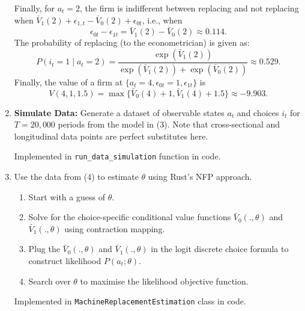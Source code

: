 \documentclass{article}
\begin{document}
\begin{enumerate}
\begin{answer}
Finally, for $a_t = 2$, the firm is indifferent between replacing and not replacing when $\bar{V}_1(2) + \epsilon_{1,t} - \bar{V}_0(2) + \epsilon_{0t}$, i.e., when 
\[
\epsilon_{0t} - \epsilon_{1t} = \bar{V}_1(2) - \bar{V}_0(2)  \approx 0.114.
\]
The probability of replacing (to the econometrician) is given as: 
\[
P(i_t = 1 \mid a_t = 2) = \frac{\exp(\bar{V}_1(2))}{\exp(\bar{V}_1(2)) + \exp(\bar{V}_0(2))} \approx 0.529.
\]
Finally, the value of a firm at $\{a_t = 4, \epsilon_{0t} = 1, \epsilon_{1t}\}$ is 
\[
V(4, 1, 1.5) = \max\{\bar{V}_0(4) + 1, \bar{V}_1(4) + 1.5\} \approx -9.903.
\]


\end{answer}



\item \textbf{Simulate Data:} Generate a dataset of observable states $a_t$ and choices $i_t $ for $T = 20,000$ periods from the model in (3). Note that cross-sectional and longitudinal data points are perfect substitutes here.

\begin{answer}
    Implemented in \texttt{run\_data\_simulation} function in code. 
\end{answer}


\item Use the data from (4) to estimate $\theta$ using Rust's NFP approach. 

\begin{enumerate}
\item Start with a guess of $\theta$. 

\item Solve for the choice-specific conditional value functions $\bar{V}_0(., \theta)$ and $\bar{V}_1(., \theta)$ using contraction mapping. 

\item Plug the $\bar{V}_0(., \theta)$ and $\bar{V}_1(., \theta)$  in the logit discrete choice formula to construct likelihood $P(a_t; \theta)$. 

\item Search over $\theta$ to maximise the likelihood objective function.

\end{enumerate}

\begin{answer}
    Implemented in \texttt{MachineReplacementEstimation} class in code. 
\end{answer}



\end{enumerate}
\end{document}
